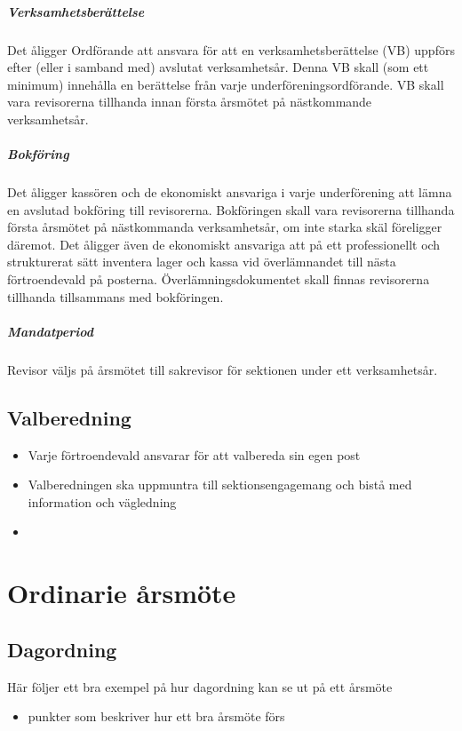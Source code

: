 \documentclass{../resources/dgovdoc}
\begin{document}
\subparagraph{Verksamhetsberättelse}

Det åligger Ordförande att ansvara för att en verksamhetsberättelse (VB) uppförs efter (eller i samband med) avslutat verksamhetsår. Denna VB skall (som ett minimum) innehålla en berättelse från varje underföreningsordförande. VB skall vara revisorerna tillhanda innan första årsmötet på nästkommande verksamhetsår.

\subparagraph{Bokföring}

Det åligger kassören och de ekonomiskt ansvariga i varje underförening att lämna en avslutad bokföring till revisorerna. Bokföringen skall vara revisorerna tillhanda första årsmötet på nästkommanda verksamhetsår, om inte starka skäl föreligger däremot.
Det åligger även de ekonomiskt ansvariga att på ett professionellt och strukturerat sätt inventera lager och kassa vid överlämnandet till nästa förtroendevald på posterna. Överlämningsdokumentet skall finnas revisorerna tillhanda tillsammans med bokföringen. 

\subparagraph{Mandatperiod}

Revisor väljs på årsmötet till sakrevisor för sektionen under ett verksamhetsår.

\subsection{Valberedning}

\begin{itemize}

\item Varje förtroendevald ansvarar för att valbereda sin egen post
\item Valberedningen ska uppmuntra till sektionsengagemang och bistå med information och vägledning
\item 

\end{itemize}

\section{Ordinarie årsmöte}

\subsection{Dagordning}

Här följer ett bra exempel på hur dagordning kan se ut på ett årsmöte

\begin{itemize}
\item punkter som beskriver hur ett bra årsmöte förs
\end{itemize}
\end{document}
